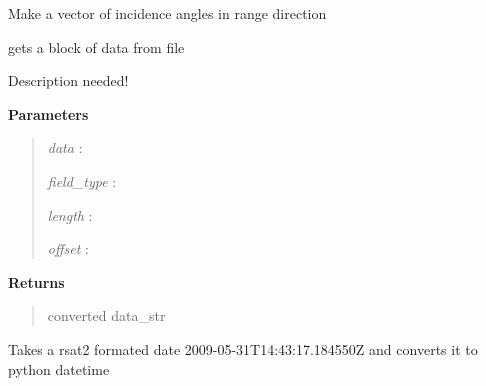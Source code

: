 \documentclass[letterpaper,10pt,openany,oneside]{sphinxmanual}
\begin{document}
\begin{fulllineitems}
\label{code:Metadata.getThetaVector}
Make a vector of incidence angles in range direction

\end{fulllineitems}


\begin{fulllineitems}
\label{code:Metadata.get_data_block}
gets a block of data from file

\end{fulllineitems}


\begin{fulllineitems}
\label{code:Metadata.get_field_value}
Description needed!

\textbf{Parameters}
\begin{quote}

\emph{data}       :

\emph{field\_type} :

\emph{length}     :

\emph{offset}     :
\end{quote}

\textbf{Returns}
\begin{quote}

converted data\_str
\end{quote}

\end{fulllineitems}


\begin{fulllineitems}
\label{code:Metadata.readdate}
Takes a rsat2 formated date 2009-05-31T14:43:17.184550Z
and converts it to python datetime

\end{fulllineitems}
\end{document}
